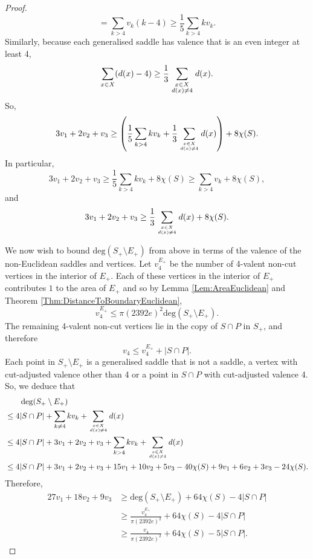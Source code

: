\documentclass[oneside]{amsart}
\numberwithin{equation}{section}
\theoremstyle{plain}
\theoremstyle{definition}
\begin{document}
\begin{proof}
$$= \sum_{k > 4} v_k (k-4) \geq \frac{1}{5} \sum_{k > 4} k v_k.$$
Similarly, because each generalised saddle has valence that is an even integer at least 4,
$$\sum_{x \in X} (d(x) - 4) \geq \frac{1}{3} \sum_{\scriptstyle  x \in X \atop \scriptstyle d(x) \not= 4} d(x).$$
So,
$$
3v_1 + 2 v_2 + v_3
\geq \left ( \frac{1} {5}  \sum_{k > 4} k v_k + \frac{1}{3} \sum_{\scriptstyle{x \in X \atop d(x) \not=4}} d(x) \right) 
+ 8 \chi(S). 
$$
In particular,
\begin{equation}
3v_1 + 2 v_2 + v_3 \geq \frac{1}{5} \sum_{k > 4} k v_k + 8 \chi(S) \geq \sum_{k > 4} v_k + 8 \chi(S),\tag{1}
\end{equation}
and
$$3 v_1 + 2 v_2 +  v_3 \geq \frac{1}{3} \sum_{\scriptstyle{x \in X \atop d(x) \not=4}} d(x) + 8 \chi(S).$$

We now wish to bound $\textrm{deg}(S_+ \setminus E_+)$ from above in terms of
the valence of the non-Euclidean saddles and vertices. Let $v_4^{E_+}$ be the number of 4-valent non-cut vertices in the interior of $E_+$. 
Each of these vertices in the interior of $E_+$ contributes $1$ to the area of $E_+$
and so by Lemma \ref{Lem:AreaEuclidean} and Theorem \ref{Thm:DistanceToBoundaryEuclidean},
$$v_4^{E_+} \leq \pi (2392e)^2 \mathrm{deg}(S_+ \setminus E_+).$$
The remaining 4-valent non-cut vertices lie in the copy of $S \cap P$ in $S_+$, and therefore
$$v_4 \leq v_4^{E_+} + |S \cap P|.$$
Each point in $S_+ \setminus E_+$ is a generalised saddle that is not a saddle, a vertex with cut-adjusted valence other than 4 or a point in
$S \cap P$ with cut-adjusted valence 4.
So, we deduce that
\begin{align*}
&\qquad \mathrm{deg}(S_+ \setminus E_+) \\
&\leq 4 |S \cap P| + \sum_{k \not=4} k v_k + 
\sum_{\scriptstyle{x \in X \atop d(x) \not=4}} d(x) \\
&\leq 4 |S \cap P| + 3v_1 + 2v_2 +  v_3 + \sum_{k >4} k v_k + 
\sum_{\scriptstyle{x \in X \atop d(x) \not=4}} d(x) \\
&\leq 4 |S \cap P| + 3v_1 + 2v_2 +  v_3 + 15v_1 + 10v_2 + 5v_3 - 40 \chi(S) + 9v_1 + 6v_2 +  3v_3 - 24\chi(S).
\end{align*}
Therefore, 
\begin{equation}
\begin{split}
27v_1 + 18 v_2 + 9 v_3 
&\geq \mathrm{deg}(S_+ \setminus E_+) + 64\chi(S) - 4 |S \cap P| \\
&\geq \frac{v_4^{E_+}}{\pi (2392e)^2} + 64\chi(S) - 4 |S \cap P| \\
&\geq \frac{v_4}{\pi (2392e)^2} + 64\chi(S) - 5|S \cap P|.

\end{split}
\end{equation}
\end{proof}
\end{document}
